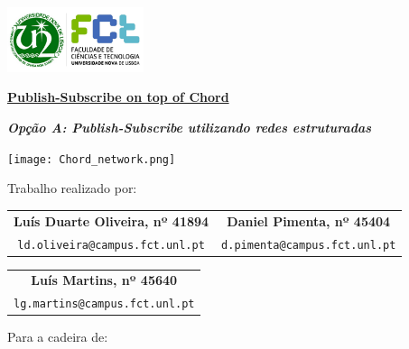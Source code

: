 \documentclass[12pt]{article}
\begin{document}
\begin{titlepage}
    \includegraphics[width=0.3\textwidth]{fctUnlLogo.jpg}
    \begin{center}
        \vspace{0.5cm}

        \begin{Large}
        	\underline{\textbf{Publish-Subscribe on top of Chord}}\\
        \end{Large}
        
        \textbf{\emph{Opção A: Publish-Subscribe utilizando redes estruturadas}}
               
        \vspace{0.3cm}

		\texttt{[image: Chord\_network.png]}
		
        \vspace{0.3cm}
        
        Trabalho realizado por:
        
        \vspace{0.5cm}

		\begin{table}[htbp]
		\centering
        	\begin{tabular}{c c}
				\textbf{Luís Duarte Oliveira, nº 41894} & \textbf{Daniel Pimenta, nº 45404}\\
				\texttt{ld.oliveira@campus.fct.unl.pt} & \texttt{d.pimenta@campus.fct.unl.pt}\\
			\end{tabular}
		\end{table}
		
		\begin{table}[htbp]
		\centering
        	\begin{tabular}{c}
				\textbf{Luís Martins, nº 45640}\\
				\texttt{lg.martins@campus.fct.unl.pt}\\
			\end{tabular}
		\end{table}
		
        \vspace{0.5cm}
        
        Para a cadeira de:
        

\end{center}
\end{titlepage}
\end{document}
